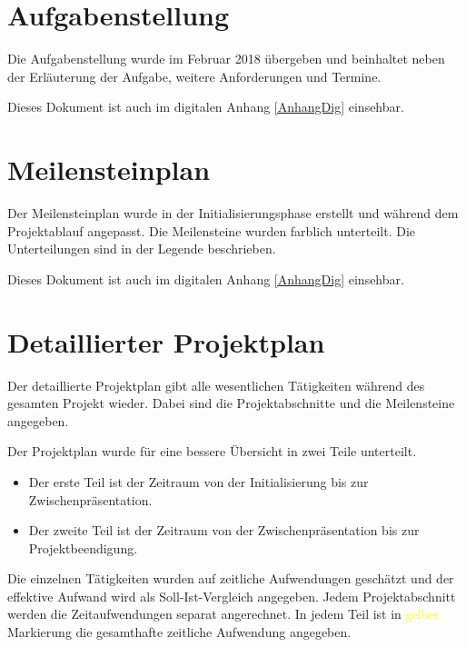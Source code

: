 \appendix

\chapter{Aufgabenstellung}
\label{AnhangAufgabenstellung}

Die Aufgabenstellung wurde im Februar 2018 übergeben und beinhaltet neben der Erläuterung der Aufgabe, weitere Anforderungen und Termine.

Dieses Dokument ist auch im digitalen Anhang \ref{AnhangDig} einsehbar.



\chapter{Meilensteinplan}
Der Meilensteinplan wurde in der Initialisierungsphase erstellt und während dem Projektablauf angepasst. Die Meilensteine wurden farblich unterteilt. Die Unterteilungen sind in der Legende beschrieben. 

Dieses Dokument ist auch im digitalen Anhang \ref{AnhangDig} einsehbar.

\label{AnhangA}


\chapter{Detaillierter Projektplan}
\label{AnhangB}

Der detaillierte Projektplan gibt alle wesentlichen Tätigkeiten während des gesamten Projekt wieder. Dabei sind die Projektabschnitte und die Meilensteine angegeben.

Der Projektplan wurde für eine bessere Übersicht in zwei Teile unterteilt. 
\begin{itemize}
\item Der erste Teil ist der Zeitraum von der Initialisierung bis zur Zwischenpräsentation.

\item Der zweite Teil ist der Zeitraum von der Zwischenpräsentation bis zur Projektbeendigung.

\end{itemize}

Die einzelnen Tätigkeiten wurden auf zeitliche Aufwendungen geschätzt und der effektive Aufwand wird als Soll-Ist-Vergleich angegeben. 
Jedem Projektabschnitt werden die Zeitaufwendungen separat angerechnet. In jedem Teil ist in \textcolor{yellow}{gelber} Markierung die gesamthafte zeitliche Aufwendung angegeben.


